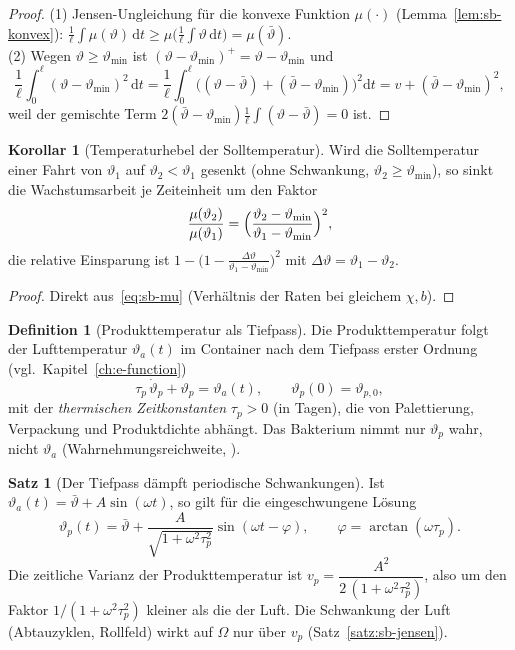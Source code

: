 \documentclass[a4paper, 12pt, twoside, openright]{report}
\theoremstyle{definition}
\newtheorem{definition}[theorem]{Definition}
\theoremstyle{definition}
\newtheorem{satz}{Satz}[chapter]
\newtheorem{korollar}{Korollar}[chapter]
\begin{document}
\begin{proof}
(1) Jensen-Ungleichung für die konvexe Funktion $\mu(\cdot)$ (Lemma~\ref{lem:sb-konvex}):
$\frac1\ell\int\mu(\vartheta)\,\mathrm dt\ge\mu\bigl(\frac1\ell\int\vartheta\,\mathrm dt\bigr)=\mu(\bar\vartheta)$.\\
(2) Wegen $\vartheta\ge\vartheta_{\min}$ ist $(\vartheta-\vartheta_{\min})^+=\vartheta-\vartheta_{\min}$ und
\[
  \frac1\ell\int_0^\ell(\vartheta-\vartheta_{\min})^2\,\mathrm dt
  =\frac1\ell\int_0^\ell\bigl((\vartheta-\bar\vartheta)+(\bar\vartheta-\vartheta_{\min})\bigr)^2\mathrm dt
  =v+(\bar\vartheta-\vartheta_{\min})^2,
\]
weil der gemischte Term $2(\bar\vartheta-\vartheta_{\min})\frac1\ell\int(\vartheta-\bar\vartheta)=0$
ist.
\end{proof}

\begin{korollar}[Temperaturhebel der Solltemperatur]\label{kor:sb-hebel}
Wird die Solltemperatur einer Fahrt von $\vartheta_1$ auf $\vartheta_2<\vartheta_1$
gesenkt (ohne Schwankung, $\vartheta_2\ge\vartheta_{\min}$), so sinkt die Wachstumsarbeit
je Zeiteinheit um den Faktor
\[
  \frac{\mu(\vartheta_2)}{\mu(\vartheta_1)}=\Bigl(\frac{\vartheta_2-\vartheta_{\min}}{\vartheta_1-\vartheta_{\min}}\Bigr)^{2},
\]
die relative Einsparung ist $1-\bigl(1-\frac{\Delta\vartheta}{\vartheta_1-\vartheta_{\min}}\bigr)^2$
mit $\Delta\vartheta=\vartheta_1-\vartheta_2$.
\end{korollar}

\begin{proof}
Direkt aus~\eqref{eq:sb-mu} (Verhältnis der Raten bei gleichem $\chi,b$).
\end{proof}

\begin{definition}[Produkttemperatur als Tiefpass]\label{def:sb-tiefpass}
Die Produkttemperatur folgt der Lufttemperatur $\vartheta_a(t)$ im Container nach dem
Tiefpass erster Ordnung (vgl.\ Kapitel~\ref{ch:e-function})
\[
  \tau_p\,\dot\vartheta_p+\vartheta_p=\vartheta_a(t),\qquad \vartheta_p(0)=\vartheta_{p,0},
\]
mit der \emph{thermischen Zeitkonstanten} $\tau_p>0$ (in Tagen), die von Palettierung,
Verpackung und Produktdichte abhängt. Das Bakterium nimmt nur $\vartheta_p$ wahr, nicht
$\vartheta_a$ (Wahrnehmungsreichweite, \cite{epp_bakterien}).
\end{definition}

\begin{satz}[Der Tiefpass dämpft periodische Schwankungen]\label{satz:sb-lp}
Ist $\vartheta_a(t)=\bar\vartheta+A\sin(\omega t)$, so gilt für die eingeschwungene
Lösung
\[
  \vartheta_p(t)=\bar\vartheta+\frac{A}{\sqrt{1+\omega^2\tau_p^2}}\sin(\omega t-\varphi),\qquad
  \varphi=\arctan(\omega\tau_p).
\]
Die zeitliche Varianz der Produkttemperatur ist $v_p=\dfrac{A^2}{2\,(1+\omega^2\tau_p^2)}$,
also um den Faktor $1/(1+\omega^2\tau_p^2)$ kleiner als die der Luft. Die Schwankung der
Luft (Abtauzyklen, Rollfeld) wirkt auf $\Omega$ nur über $v_p$ (Satz~\ref{satz:sb-jensen}).
\end{satz}
\end{document}
